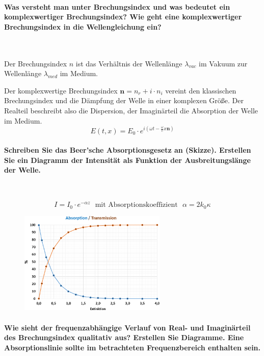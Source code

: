\documentclass[a4paper, 11pt, ngerman, parskip=half-]{scrartcl}
\begin{document}
\paragraph{Was versteht man unter Brechungsindex und was bedeutet ein komplexwertiger
    Brechungsindex? Wie geht eine komplexwertiger Brechungsindex in die Wellengleichung ein?} ~

Der Brechungsindex $n$ ist das Verhältnis der Wellenlänge $\lambda_{vac}$ im Vakuum zur Wellenlänge
$\lambda_{med}$ im Medium.

Der komplexwertige Brechungsindex $\mathbf{n} = n_r + i \cdot n_i$ vereint den klassischen
Brechungsindex und die Dämpfung der Welle in einer komplexen Größe. Der Realteil beschreibt also die
Dispersion, der Imaginärteil die Absorption der Welle im Medium.
\begin{equation}
    E(t,x) = E_0 \cdot e^{i(\omega t - \frac{\omega}{c} x \mathbf{n})}
\end{equation}

\paragraph{Schreiben Sie das Beer'sche Absorptionsgesetz an (Skizze). Erstellen Sie ein Diagramm der
    Intensität als Funktion der Ausbreitungslänge der Welle.} ~

\begin{equation}
    I = I_0 \cdot e^{- \alpha z} ~~~ \text{mit Absorptionskoeffizient} ~~~ \alpha = 2 k_0 \kappa
\end{equation}

\begin{figure}[H]
    \centering
    \includegraphics[width=7cm]{image/14/5}
\end{figure}

\paragraph{Wie sieht der frequenzabhängige Verlauf von Real- und Imaginärteil des Brechungsindex
    qualitativ aus? Erstellen Sie Diagramme. Eine Absorptionslinie sollte im betrachteten
    Frequenzbereich enthalten sein.} ~
\end{document}
